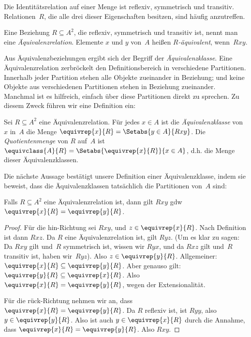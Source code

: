 \documentclass[../../../include/open-logic-section]{subfiles}
\begin{document}


Die Identitätsrelation auf einer Menge ist reflexiv, symmetrisch und
transitiv. Relationen~$R$, die alle drei dieser Eigenschaften besitzen, 
sind häufig anzutreffen.

\begin{defn}[Äquivalenzrelation] 
Eine Beziehung $R \subseteq A^2$, die reflexiv, symmetrisch und
transitiv ist, nennt man eine \emph{Äquivalenzrelation}. Elemente $x$
und $y$ von~$A$ heißen \emph{$R$-äquivalent}, wenn~$Rxy$.
\end{defn}

Aus Äquivalenzbeziehungen ergibt sich der Begriff der \emph{Äquivalenzklasse}.
Eine Äquivalenzrelation \glqq zerbröckelt\grqq{} den Definitionsbereich in
verschiedene Partitionen. Innerhalb jeder Partition stehen alle Objekte zueinander 
in Beziehung; und keine Objekte aus verschiedenen Partitionen
stehen in Beziehung zueinander. Manchmal ist es hilfreich, einfach über
diese Partitionen direkt zu sprechen. Zu diesem Zweck führen wir eine
Definition ein:

\begin{defn}
Sei $R \subseteq A^2$ eine Äquivalenzrelation. Für jedes $x \in A$
ist die \emph{Äquivalenzklasse} von $x$ in~$A$ die Menge $\equivrep{x}{R}
= \Setabs{y \in A}{Rxy}$. Die \emph{Quotientenmenge} von $R$ auf~$A$ ist
$\equivclass{A}{R} = \Setabs{\equivrep{x}{R}}{x \in A}$, d.h. die Menge
dieser Äquivalenzklassen. 
\end{defn}

Die nächste Aussage bestätigt unsere Definition einer Äquivalenzklasse,
indem sie beweist, dass die Äquivalenzklassen tatsächlich die Partitionen von~$A$ sind:

\begin{prop}
Falls $R \subseteq A^2$ eine Äquivalenzrelation ist, dann gilt $Rxy$ gdw
$\equivrep{x}{R} = \equivrep{y}{R}$.
\end{prop}

\begin{proof}
Für die hin-Richtung sei $Rxy$, und $z \in
\equivrep{x}{R}$. Nach Definition ist dann $Rxz$. Da $R$ eine
Äquivalenzrelation ist, gilt $Ryz$. (Um es klar zu sagen: Da $Rxy$ gilt und~$R$
symmetrisch ist, wissen wir $Ryx$, und da $Rxz$ gilt und~$R$ transitiv ist,
haben wir~$Ryz$). Also $z \in \equivrep{y}{R}$. Allgemeiner:
$\equivrep{x}{R} \subseteq \equivrep{y}{R}$. Aber genauso gilt:
$\equivrep{y}{R} \subseteq \equivrep{x}{R}$. Also $\equivrep{x}{R} =
\equivrep{y}{R}$, wegen der Extensionalität.

Für die rück-Richtung nehmen wir an, dass $\equivrep{x}{R} =
\equivrep{y}{R}$. Da $R$ reflexiv ist, ist $Ryy$, also $y \in
\equivrep{y}{R}$. Also ist auch $y \in \equivrep{x}{R}$ durch die Annahme,
dass $\equivrep{x}{R} = \equivrep{y}{R}$. Also $Rxy$.
\end{proof}
\end{document}
